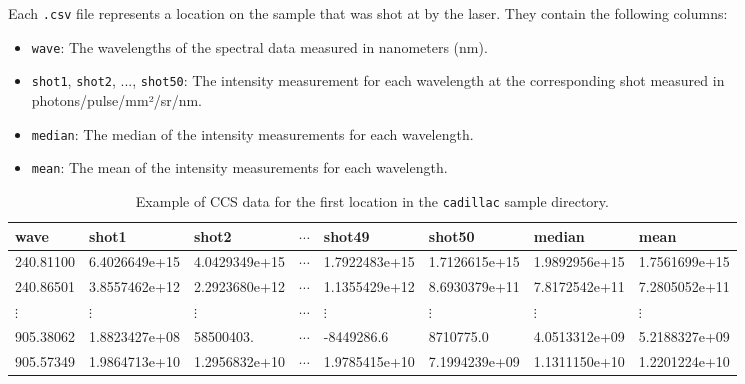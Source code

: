 Each \texttt{.csv} file represents a location on the sample that was shot at by the laser.
They contain the following columns:

\begin{itemize}
    \item \texttt{wave}: The wavelengths of the spectral data measured in nanometers (nm).
    \item \texttt{shot1}, \texttt{shot2}, ..., \texttt{shot50}: The intensity measurement for each wavelength at the corresponding shot measured in photons/pulse/mm²/sr/nm.
    \item \texttt{median}: The median of the intensity measurements for each wavelength.
    \item \texttt{mean}: The mean of the intensity measurements for each wavelength.
\end{itemize}

\begin{table}[!b]
\centering
\begin{tabular}{llllllll}
\toprule
     wave &         shot1 &         shot2 &  $\cdots$ &        shot49 &       shot50  & median        & mean          \\
\midrule
240.81100 & 6.4026649e+15 & 4.0429349e+15 & $\cdots$  & 1.7922483e+15 & 1.7126615e+15 & 1.9892956e+15 & 1.7561699e+15 \\
240.86501 & 3.8557462e+12 & 2.2923680e+12 & $\cdots$  & 1.1355429e+12 & 8.6930379e+11 & 7.8172542e+11 & 7.2805052e+11 \\
$\vdots$  & $\vdots$      & $\vdots$      & $\cdots$  & $\vdots$      & $\vdots$      & $\vdots$      & $\vdots$      \\
905.38062 & 1.8823427e+08 & 58500403.     & $\cdots$  & -8449286.6    & 8710775.0     & 4.0513312e+09 & 5.2188327e+09 \\
905.57349 & 1.9864713e+10 & 1.2956832e+10 & $\cdots$  & 1.9785415e+10 & 7.1994239e+09 & 1.1311150e+10 & 1.2201224e+10 \\
\bottomrule
\end{tabular}
\caption{Example of CCS data for the first location in the \texttt{cadillac} sample directory.}
\label{tab:ccs_data_example}
\end{table}

